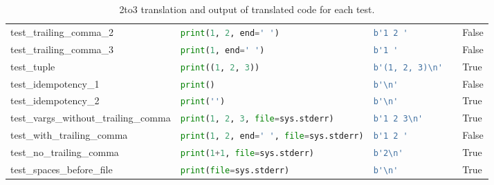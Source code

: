 \begin{table*}[ht]
\begin{tabular}{@{}l|lll@{}}
    test\_trailing\_comma\_2              & \lstinline[language=Python, style=pythonstyle]|print(1, 2, end=' ')                 | & \lstinline[language=Python, style=pythonstyle]|b'1 2 '  |                              & False               \\
    test\_trailing\_comma\_3              & \lstinline[language=Python, style=pythonstyle]|print(1, end=' ')                    | & \lstinline[language=Python, style=pythonstyle]|b'1 '        |                          & False               \\
    test\_tuple                           & \lstinline[language=Python, style=pythonstyle]|print((1, 2, 3))                     | & \lstinline[language=Python, style=pythonstyle]|b'(1, 2, 3)\n'  |        & True                \\
    test\_idempotency\_1                  & \lstinline[language=Python, style=pythonstyle]|print()                              | & \lstinline[language=Python, style=pythonstyle]|b'\n'     |              & False               \\
    test\_idempotency\_2                  & \lstinline[language=Python, style=pythonstyle]|print('')                            | & \lstinline[language=Python, style=pythonstyle]|b'\n'        |           & True                \\
    test\_vargs\_without\_trailing\_comma & \lstinline[language=Python, style=pythonstyle]|print(1, 2, 3, file=sys.stderr)      | & \lstinline[language=Python, style=pythonstyle]|b'1 2 3\n'  |            & True                \\
    test\_with\_trailing\_comma           & \lstinline[language=Python, style=pythonstyle]|print(1, 2, end=' ', file=sys.stderr)| & \lstinline[language=Python, style=pythonstyle]|b'1 2 '    |                            & False               \\
    test\_no\_trailing\_comma             & \lstinline[language=Python, style=pythonstyle]|print(1+1, file=sys.stderr)          | & \lstinline[language=Python, style=pythonstyle]|b'2\n'    |             & True                \\
    test\_spaces\_before\_file            & \lstinline[language=Python, style=pythonstyle]|print(file=sys.stderr)               | & \lstinline[language=Python, style=pythonstyle]|b'\n'   |                & True                \\ \bottomrule
    \end{tabular}
    \caption{2to3 translation and output of translated code for each test.}
    \label{table:2to3-accuracy}
\end{table*}

